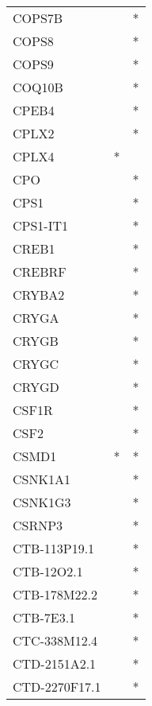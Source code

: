 \begin{longtable}{lcc}
COPS7B          &                &          * \\
COPS8           &                &          * \\
COPS9           &                &          * \\
COQ10B          &                &          * \\
CPEB4           &                &          * \\
CPLX2           &                &          * \\
CPLX4           &              * &            \\
CPO             &                &          * \\
CPS1            &                &          * \\
CPS1-IT1        &                &          * \\
CREB1           &                &          * \\
CREBRF          &                &          * \\
CRYBA2          &                &          * \\
CRYGA           &                &          * \\
CRYGB           &                &          * \\
CRYGC           &                &          * \\
CRYGD           &                &          * \\
CSF1R           &                &          * \\
CSF2            &                &          * \\
CSMD1           &              * &          * \\
CSNK1A1         &                &          * \\
CSNK1G3         &                &          * \\
CSRNP3          &                &          * \\
CTB-113P19.1    &                &          * \\
CTB-12O2.1      &                &          * \\
CTB-178M22.2    &                &          * \\
CTB-7E3.1       &                &          * \\
CTC-338M12.4    &                &          * \\
CTD-2151A2.1    &                &          * \\
CTD-2270F17.1   &                &          * \\

\end{longtable}
